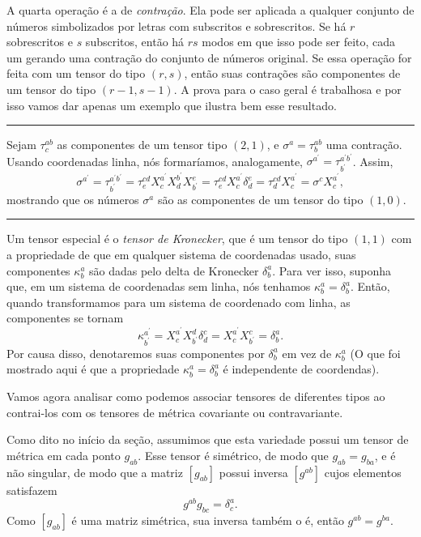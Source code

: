 A quarta operação é a de \textit{contração}. Ela pode ser aplicada a qualquer conjunto de números simbolizados por letras com subscritos e sobrescritos. Se há $r$ sobrescritos e $s$ subscritos, então há $rs$ modos em que isso pode ser feito, cada um gerando uma contração do conjunto de números original. Se essa operação for feita com um tensor do tipo $(r,s)$, então suas contrações são componentes de um tensor do tipo $(r-1,s-1)$. A prova para o caso geral é trabalhosa e por isso vamos dar apenas um exemplo que ilustra bem esse resultado.


\noindent
\rule{\textwidth}{0.4pt}
\begin{exemplo}
Sejam $\tau^{ab}_c$ as componentes de um tensor tipo $(2,1)$, e $\sigma^a=\tau^{ab}_b$ uma contração. Usando coordenadas linha, nós formaríamos, analogamente, $\sigma^{a^\prime}=\tau^{a^\prime b^\prime}_{b^\prime}$. Assim,
\[
	\sigma^{a^{\prime}}=\tau_{b^{\prime}}^{a^{\prime} b^{\prime}}=\tau_{e}^{c d} X_{c}^{a^{\prime}} X_{d}^{b^{\prime}} X_{b^{\prime}}^{e}=\tau_{e}^{c d} X_{c}^{a^{\prime}} \delta_{d}^{e}=\tau_{d}^{c d} X_{c}^{a^{\prime}}=\sigma^{c} X_{c}^{a^{\prime}} ,
\]
mostrando que os números $\sigma^a$ são as componentes de um tensor do tipo $(1,0)$.

\noindent
\rule{\textwidth}{0.4pt}	
\end{exemplo}

Um tensor especial é o \textit{tensor de Kronecker}, que é um tensor do tipo $(1,1)$ com a propriedade de que em qualquer sistema de coordenadas usado, suas componentes $\kappa^a_b$ são dadas pelo delta de Kronecker $\delta^a_b$. Para ver isso, suponha que, em um sistema de coordenadas sem linha, nós tenhamos $\kappa_b^a=\delta^a_b$. Então, quando transformamos para um sistema de coordenado com linha, as componentes se tornam
\[
	\kappa^{a^\prime}_{b^\prime} = X^{a^\prime}_c X^d_{b^\prime}\delta^c_d = X^{a^\prime}_c X^c_{b^\prime} = \delta^a_b .
\]
Por causa disso, denotaremos suas componentes por $\delta^a_b$ em vez de $\kappa^a_b$ (O que foi mostrado aqui é que a propriedade $\kappa^a_b=\delta^a_b$ é independente de coordendas).

Vamos agora analisar como podemos associar tensores de diferentes tipos ao contrai-los com os tensores de métrica covariante ou contravariante.

Como dito no início da seção, assumimos que esta variedade possui um tensor de métrica em cada ponto $g_{ab}$. Esse tensor é simétrico, de modo que $g_{ab}=g_{ba}$, e é não singular, de modo que a matriz $[g_{ab}]$ possui inversa $[g^{ab}]$ cujos elementos satisfazem
\begin{equation}\label{eq:TensorMetricaDelta}
	g^{ab}g_{bc}=\delta^a_c .
\end{equation}
Como $[g_{ab}]$ é uma matriz simétrica, sua inversa também o é, então $g^{ab}=g^{ba}$.

